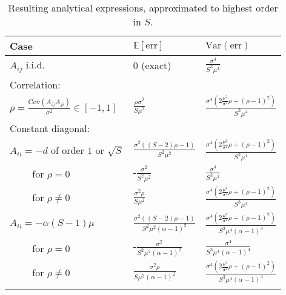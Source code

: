 \documentclass[10pt]{article}
\begin{document}
\begin{table}[h]
    \centering
    \caption[Results]{Resulting analytical expressions, approximated to highest order in $S$. 
        }
    \label{tab:model_description}
    \small
    {\tabulinesep=1.2mm
       \begin{tabu} {b{5.cm} p{3.cm} p{3.cm}}
            \textbf{Case} & $\mathbb{E}[\mathrm{err}]$ & $\mathrm{Var}(\mathrm{err})$ \\
           \hline
    $A_{ij}$ i.i.d.                    & $0$ (exact)                     & $\frac{\sigma^4}{S^3 \mu^4}$   \\
    \vspace{1.mm}
    Correlation: &&\\
    $\rho = \frac{\mathrm{Cov}(A_{ij}A_{ji})}{\sigma^2}  \in [-1, 1]$     & $\frac{\rho \sigma^2}{S\mu^2}$ & $\frac{\sigma^4 \left(2\frac{\mu^2}{\sigma^2} \rho + (\rho - 1)^2\right) }{S^3 \mu^4} $   \\ 
    \vspace{1.mm}
    Constant diagonal: &&\\
    $A_{ii} = -d$ of order $1$ or $\sqrt{S}$    & $\frac{\sigma^2\left((S - 2)\rho - 1\right)}{S^2\mu^2}$ & $\frac{\sigma^4 \left(2\frac{\mu^2}{\sigma^2} \rho + (\rho - 1)^2\right)}{S^3 \mu^4} $   \\
    $\qquad$ for $\rho = 0$   & -$\frac{\sigma^2}{S^2\mu^2}$ & $\frac{\sigma^4}{S^3 \mu^4} $   \\
    $\qquad$ for $\rho \ne 0$ & $\frac{\sigma^2\rho}{S\mu^2}$ & $\frac{\sigma^4 \left(2\frac{\mu^2}{\sigma^2} \rho + (\rho - 1)^2\right)}{S^3 \mu^4} $   \\
    $A_{ii} = -\alpha (S - 1) \mu$ & $\frac{\sigma^2\left((S - 2)\rho - 1\right)}{S^2\mu^2(\alpha - 1)^2}$ & $\frac{\sigma^4 \left(2\frac{\mu^2}{\sigma^2} \rho + (\rho - 1)^2\right)}{S^3 \mu^4(\alpha - 1)^4} $   \\
    $\qquad$ for $\rho = 0$   & -$\frac{\sigma^2}{S^2\mu^2(\alpha - 1)^2}$ & $\frac{\sigma^4 }{S^3 \mu^4(\alpha - 1)^4} $  \\
    $\qquad$ for $\rho \ne 0$ & $\frac{\sigma^2\rho}{S\mu^2(\alpha - 1)^2}$ & $\frac{\sigma^4 \left(2\frac{\mu^2}{\sigma^2} \rho + (\rho - 1)^2\right)}{S^3 \mu^4(\alpha - 1)^4} $ \\\hline
    \label{tab:results}
   \end{tabu}}
\end{table}
\end{document}
